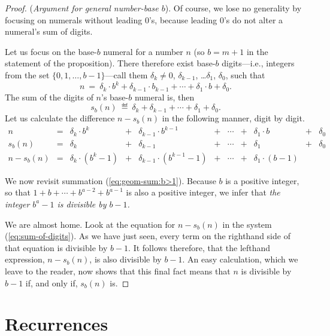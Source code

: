 \begin{proof}
({\it Argument for general number-base $b$}).
%
Of course, we lose no generality by focusing on numerals without
leading $0$'s, because leading $0$'s do not alter a numeral's sum of
digits.

Let us focus on the base-$b$ numeral for a number $n$ (so $b = m+1$ in
the statement of the proposition).  There therefore exist base-$b$
digits---i.e., integers from the set $\{0, 1, \ldots, b-1\}$---call
them $\delta_k \neq 0$, $\delta_{k-1}$, \ldots $\delta_1$, $\delta_0$,
such that
\[ n \ = \ \delta_k \cdot b^k + \delta_{k-1} \cdot b_{k-1} + \cdots +
\delta_1 \cdot b + \delta_0. \]
The sum of the digits of $n$'s base-$b$ numeral is, then
\[ s_b(n) \ \eqdef \ \delta_k + \delta_{k-1} + \cdots + \delta_1 +
\delta_0. \]
Let us calculate the difference $n - s_b(n)$ in the following manner,
digit by digit.
\begin{equation}
\label{eq:sum-of-digits}
\begin{array}{ccccccccccc}
n & = &
\delta_k \cdot b^k & + & \delta_{k-1} \cdot b^{k-1} & + & \cdots
  & + & \delta_1 \cdot b & + & \delta_0 \\
s_b(n) & = &
\delta_k & + & \delta_{k-1} & + & \cdots & + & \delta_1 & + & \delta_0 \\
\hline
n - s_b(n) & = &
\delta_k \cdot (b^k -1) & + &
\delta_{k-1} \cdot (b^{k-1} -1) & + &
\cdots & + &
\delta_1 \cdot (b-1) & & 
\end{array}
\end{equation}

\medskip

We now revisit summation (\ref{eq:geom-sum:b>1}).  Because $b$ is a
positive integer, so that $1 + b + \cdots + b^{a-2} + b^{a-1}$ is also
a positive integer, we infer that {\em the integer $b^a -1$ is
  divisible by $b-1$.}

We are almost home.  Look at the equation for $n - s_b(n)$ in the
system (\ref{eq:sum-of-digits}).  As we have just seen, every term on
the righthand side of that equation is divisible by $b-1$.  It follows
therefore, that the lefthand expression, $n - s_b(n)$, is also
divisible by $b-1$.
An easy calculation, which we leave to the reader, now shows that this
final fact means that $n$ is divisible by $b-1$ if, and only if,
$s_b(n)$ is.
\end{proof}


\section{Recurrences}

